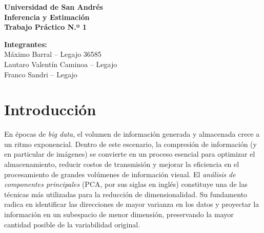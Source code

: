\documentclass[12pt]{article}
\begin{document}
\thispagestyle{empty}

\thispagestyle{empty}
\begin{center}
    \vspace*{\fill}

    {\Large \textbf{Universidad de San Andrés}}\\[0.8cm]

    {\Huge \textbf{Inferencia y Estimación}}\\[0.6cm]
    {\LARGE \textbf{Trabajo Práctico N.º 1}}\\[1.5cm]


    \vspace{1.6cm}

    {\large \textbf{Integrantes:}}\\[0.4cm]
    {\large Máximo Barral -- Legajo 36585}\\[0.2cm]
    {\large Lautaro Valentín Caminoa -- Legajo}\\[0.2cm]
    {\large Franco Sandri -- Legajo}\\[1.4cm]

    \vspace*{\fill}
\end{center}
\newpage

\setcounter{page}{1}    %
\pagestyle{plain}       %

\section{Introducción}
En épocas de \textit{big data}, el volumen de información generada y almacenada crece a un ritmo exponencial. Dentro de este escenario, la compresión de información (y en particular de imágenes) se convierte en un proceso esencial para optimizar el almacenamiento, reducir costos de transmisión y mejorar la eficiencia en el procesamiento de grandes volúmenes de información visual. El \textit{análisis de componentes principales} (PCA, por sus siglas en inglés) constituye una de las técnicas más utilizadas para la reducción de dimensionalidad. Su fundamento radica en identificar las direcciones de mayor varianza en los datos y proyectar la información en un subespacio de menor dimensión, preservando la mayor cantidad posible de la variabilidad original. 
\end{document}

